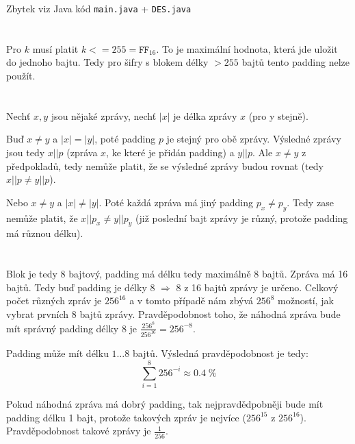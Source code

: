 \documentclass[12pt, a4paper]{article}
\begin{document}
Zbytek viz Java kód \texttt{main.java} + \texttt{DES.java}

\section{}
Pro $k$ musí platit $k<=255 = \texttt{FF}_{16}$. To je maximální hodnota, která jde uložit do jednoho bajtu. Tedy pro šifry s blokem délky $>255$ bajtů tento padding nelze použít.

\section{}
Nechť $x,y$ jsou nějaké zprávy, nechť $|x|$ je délka zprávy $x$ (pro y stejně).

Buď $x\neq y$ a $|x|=|y|$, poté padding $p$ je stejný pro obě zprávy. Výsledné zprávy jsou tedy $x||p$ (zpráva $x$, ke které je přidán padding) a $y||p$. Ale $x \neq y$ z předpokladů, tedy nemůže platit, že se výsledné zprávy budou rovnat (tedy $x||p \neq y||p$).

Nebo $x\neq y$ a $|x| \neq |y|$. Poté každá zpráva má jiný padding $p_x \neq p_y$. Tedy zase nemůže platit, že $x||p_x \neq y||p_y$ (již poslední bajt zprávy je různý, protože padding má různou délku).

\section{}
Blok je tedy 8 bajtový, padding má délku tedy maximálně 8 bajtů. Zpráva má 16 bajtů. Tedy buď padding je délky 8 $\Rightarrow$ 8 z 16 bajtů zprávy je určeno. Celkový počet různých zpráv je $256^{16}$ a v tomto případě nám zbývá $256^8$ možností, jak vybrat prvních 8 bajtů zprávy. Pravděpodobnost toho, že náhodná zpráva bude mít správný padding délky 8 je $\frac{256^8}{256^{16}}=256^{-8}$.

Padding může mít délku $1\dots8$ bajtů. Výsledná pravděpodobnost je tedy:
$$\sum_{i=1}^8 256^{-i} \approx 0.4\; \%$$

Pokud náhodná zpráva má dobrý padding, tak nejpravdědpobněji bude mít padding délku 1 bajt, protože takových zpráv je nejvíce ($256^{15}$ z $256^{16}$). Pravděpodobnost takové zprávy je $\frac{1}{256}$.
\end{document}
